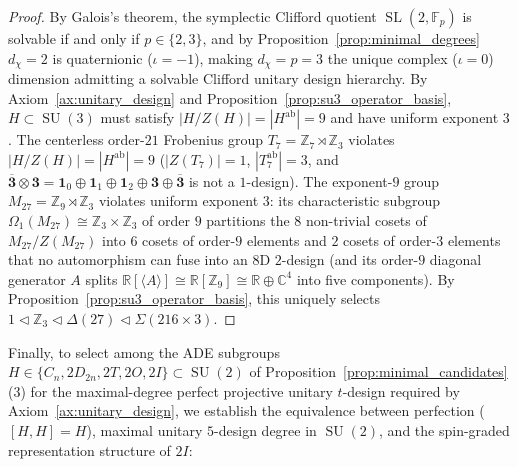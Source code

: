 \documentclass[11pt,a4paper]{article}
\theoremstyle{definition}
\theoremstyle{remark}
\newcommand{\R}{\mathbb{R}}
\newcommand{\C}{\mathbb{C}}
\newcommand{\Z}{\mathbb{Z}}
\newcommand{\F}{\mathbb{F}}
\newcommand{\SU}{\operatorname{SU}}
\newcommand{\SL}{\operatorname{SL}}
\begin{document}
\begin{proof}
By Galois's theorem, the symplectic Clifford quotient $\SL(2,\F_p)$ is solvable if and only if $p \in \{2, 3\}$, and by Proposition~\ref{prop:minimal_degrees} $d_\chi = 2$ is quaternionic ($\iota = -1$), making $d_\chi = p = 3$ the unique complex ($\iota = 0$) dimension admitting a solvable Clifford unitary design hierarchy. By Axiom~\ref{ax:unitary_design} and Proposition~\ref{prop:su3_operator_basis}, $H \subset \SU(3)$ must satisfy $|H/Z(H)| = |H^{\mathrm{ab}}| = 9$ and have uniform exponent $3$. The centerless order-$21$ Frobenius group $T_7 = \Z_7 \rtimes \Z_3$ violates $|H/Z(H)| = |H^{\mathrm{ab}}| = 9$ ($|Z(T_7)| = 1$, $|T_7^{\mathrm{ab}}| = 3$, and $\overline{\mathbf{3}} \otimes \mathbf{3} = \mathbf{1}_0 \oplus \mathbf{1}_1 \oplus \mathbf{1}_2 \oplus \mathbf{3} \oplus \overline{\mathbf{3}}$ is not a $1$-design). The exponent-$9$ group $M_{27} = \Z_9 \rtimes \Z_3$ violates uniform exponent $3$: its characteristic subgroup $\Omega_1(M_{27}) \cong \Z_3 \times \Z_3$ of order $9$ partitions the $8$ non-trivial cosets of $M_{27}/Z(M_{27})$ into $6$ cosets of order-$9$ elements and $2$ cosets of order-$3$ elements that no automorphism can fuse into an $8$D $2$-design (and its order-$9$ diagonal generator $A$ splits $\R[\langle A\rangle] \cong \R[\Z_9] \cong \R \oplus \C^4$ into five components). By Proposition~\ref{prop:su3_operator_basis}, this uniquely selects $1 \triangleleft \Z_3 \triangleleft \Delta(27) \triangleleft \Sigma(216 \times 3)$.
\end{proof}

Finally, to select among the ADE subgroups $H \in \{C_n, 2D_{2n}, 2T, 2O, 2I\} \subset \SU(2)$ of Proposition~\ref{prop:minimal_candidates}(3) for the maximal-degree perfect projective unitary $t$-design required by Axiom~\ref{ax:unitary_design}, we establish the equivalence between perfection ($[H,H] = H$), maximal unitary $5$-design degree in $\SU(2)$, and the spin-graded representation structure of $2I$:
\end{document}
